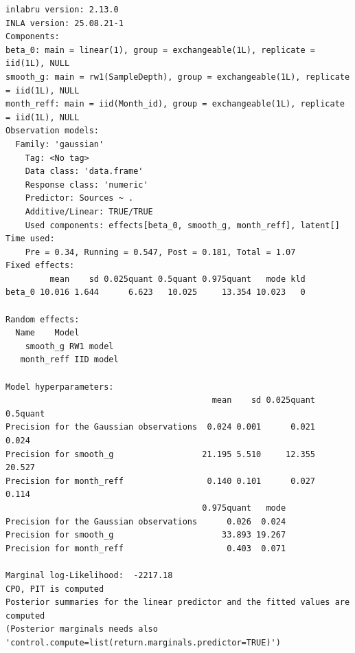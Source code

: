 \documentclass[
  letterpaper,
  DIV=11,
  numbers=noendperiod]{scrartcl}
\newenvironment{Shaded}{\begin{snugshade}}{\end{snugshade}}
\newcommand{\AttributeTok}[1]{\textcolor[rgb]{0.40,0.45,0.13}{#1}}
\newcommand{\CommentTok}[1]{\textcolor[rgb]{0.37,0.37,0.37}{#1}}
\newcommand{\DecValTok}[1]{\textcolor[rgb]{0.68,0.00,0.00}{#1}}
\newcommand{\ErrorTok}[1]{\textcolor[rgb]{0.68,0.00,0.00}{#1}}
\newcommand{\FunctionTok}[1]{\textcolor[rgb]{0.28,0.35,0.67}{#1}}
\newcommand{\NormalTok}[1]{\textcolor[rgb]{0.00,0.23,0.31}{#1}}
\newcommand{\OtherTok}[1]{\textcolor[rgb]{0.00,0.23,0.31}{#1}}
\newcommand{\SpecialCharTok}[1]{\textcolor[rgb]{0.37,0.37,0.37}{#1}}
\newcommand{\StringTok}[1]{\textcolor[rgb]{0.13,0.47,0.30}{#1}}
\begin{document}
\begin{Shaded}
\end{Shaded}

\begin{verbatim}
inlabru version: 2.13.0
INLA version: 25.08.21-1
Components:
beta_0: main = linear(1), group = exchangeable(1L), replicate = iid(1L), NULL
smooth_g: main = rw1(SampleDepth), group = exchangeable(1L), replicate = iid(1L), NULL
month_reff: main = iid(Month_id), group = exchangeable(1L), replicate = iid(1L), NULL
Observation models:
  Family: 'gaussian'
    Tag: <No tag>
    Data class: 'data.frame'
    Response class: 'numeric'
    Predictor: Sources ~ .
    Additive/Linear: TRUE/TRUE
    Used components: effects[beta_0, smooth_g, month_reff], latent[]
Time used:
    Pre = 0.34, Running = 0.547, Post = 0.181, Total = 1.07 
Fixed effects:
         mean    sd 0.025quant 0.5quant 0.975quant   mode kld
beta_0 10.016 1.644      6.623   10.025     13.354 10.023   0

Random effects:
  Name    Model
    smooth_g RW1 model
   month_reff IID model

Model hyperparameters:
                                          mean    sd 0.025quant 0.5quant
Precision for the Gaussian observations  0.024 0.001      0.021    0.024
Precision for smooth_g                  21.195 5.510     12.355   20.527
Precision for month_reff                 0.140 0.101      0.027    0.114
                                        0.975quant   mode
Precision for the Gaussian observations      0.026  0.024
Precision for smooth_g                      33.893 19.267
Precision for month_reff                     0.403  0.071

Marginal log-Likelihood:  -2217.18 
CPO, PIT is computed 
Posterior summaries for the linear predictor and the fitted values are computed
(Posterior marginals needs also 'control.compute=list(return.marginals.predictor=TRUE)')
\end{verbatim}
\end{document}
